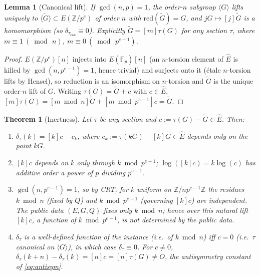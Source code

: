 \documentclass[11pt]{article}
\newtheorem{theorem}{Theorem}
\newtheorem{lemma}{Lemma}
\theoremstyle{definition}
\newcommand{\Fp}{\mathbb{F}_p}
\newcommand{\Z}{\mathbb{Z}}
\newcommand{\Ehat}{\widehat{E}}
\newcommand{\red}{\mathrm{red}}
\begin{document}
\begin{lemma}[Canonical lift]\label{lem:can}
If $\gcd(n,p)=1$, the order-$n$ subgroup $\langle G\rangle$ lifts
uniquely to $\langle\widetilde G\rangle\subset E(\Z/p^e)$ of order $n$
with $\red(\widetilde G)=G$, and $jG\mapsto[j]\widetilde G$ is a
homomorphism (so $\delta_{\tau_{\mathrm{can}}}\equiv 0$). Explicitly
$\widetilde G=[m]\tau(G)$ for any section $\tau$, where
$m\equiv 1\ (\bmod\,n)$, $m\equiv 0\ (\bmod\,p^{e-1})$.
\end{lemma}

\begin{proof}
$E(\Z/p^e)[n]$ injects into $E(\Fp)[n]$ (an $n$-torsion element of
$\Ehat$ is killed by $\gcd(n,p^{e-1})=1$, hence trivial) and surjects
onto it (étale $n$-torsion lifts by Hensel), so reduction is an
isomorphism on $n$-torsion and $\widetilde G$ is the unique order-$n$
lift of $G$. Writing $\tau(G)=\widetilde G+c$ with $c\in\Ehat$,
$[m]\tau(G)=[m\bmod n]\widetilde G+[m\bmod p^{e-1}]c=\widetilde G$.
\end{proof}

\begin{theorem}[Inertness]\label{thm:main}
Let $\tau$ be any section and $c:=\tau(G)-\widetilde G\in\Ehat$. Then:
\begin{enumerate}
\item[(a)] $\delta_\tau(k)=[k]c-c_k$, where $c_k:=\tau(kG)-[k]\widetilde G
\in\Ehat$ depends only on the point $kG$.
\item[(b)] $[k]c$ depends on $k$ only through $k\bmod p^{e-1}$;
$\log([k]c)=k\log(c)$ has additive order a power of $p$ dividing
$p^{e-1}$.
\item[(c)] $\gcd(n,p^{e-1})=1$, so by CRT, for $k$ uniform on
$\Z/np^{e-1}\Z$ the residues $k\bmod n$ (fixed by $Q$) and $k\bmod
p^{e-1}$ (governing $[k]c$) are independent. The public data $(E,G,Q)$
fixes only $k\bmod n$; hence over this natural lift $[k]c$, a function of
$k\bmod p^{e-1}$, is not determined by the public data.
\item[(d)] $\delta_\tau$ is a well-defined function of the instance
(i.e.\ of $k\bmod n$) iff $c=0$ (i.e.\ $\tau$ canonical on
$\langle G\rangle$), in which case $\delta_\tau\equiv 0$. For $c\neq 0$,
$\delta_\tau(k+n)-\delta_\tau(k)=[n]c=[n]\tau(G)\neq O$, the antisymmetry
constant of \eqref{eq:antisym}.
\end{enumerate}
\end{theorem}
\end{document}
